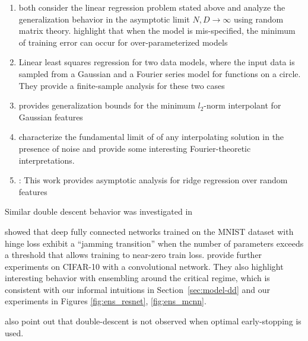 \begin{enumerate}
    \item \cite{advani2017high, hastie2019surprises} both consider the linear regression problem stated above and analyze the generalization behavior in the asymptotic limit $N, D \rightarrow \infty$ using random matrix theory. \cite{hastie2019surprises} highlight that when the model is mis-specified, the minimum of training error can occur for over-parameterized models
    \item \cite{belkin2019two} Linear least squares regression for two data models, where the input data is sampled from a Gaussian and a Fourier series model for functions on a circle. They provide a finite-sample analysis for these two cases
    \item \cite{bartlett2019benign} provides generalization bounds for the minimum $l_2$-norm interpolant for Gaussian features
    \item \cite{muthukumar2019harmless} characterize the fundamental limit of of any interpolating solution in the presence of noise and provide some interesting Fourier-theoretic interpretations.
    \item \cite{mei2019generalization}: This work provides asymptotic analysis for ridge regression over random features
\end{enumerate}

Similar double descent behavior was investigated in \cite{opper1995statistical, opper2001learning}

\cite{geiger2019jamming} showed that deep fully connected networks trained on the MNIST dataset with hinge loss exhibit a ``jamming transition'' when the number of parameters exceeds a threshold that allows training to near-zero train loss. \cite{geiger2019scaling} provide further experiments on CIFAR-10 with a convolutional network. They also highlight interesting behavior with ensembling around the critical regime, which is consistent with our
informal intuitions in Section~\ref{sec:model-dd} and our experiments in Figures \ref{fig:ens_resnet}, \ref{fig:ens_mcnn}.

\cite{advani2017high, geiger2019jamming, geiger2019scaling} also point out that double-descent is not observed when optimal early-stopping is used.






